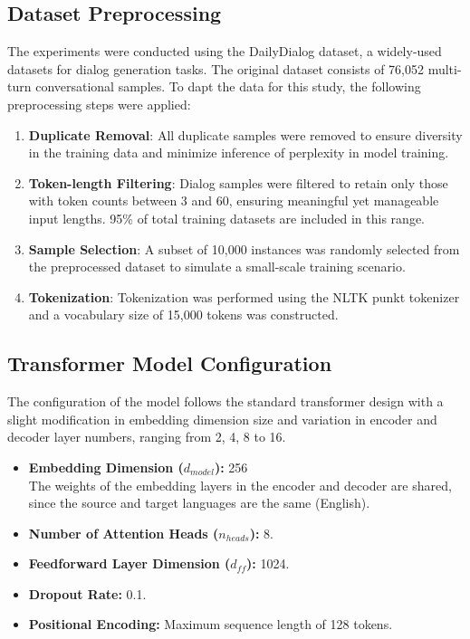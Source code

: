 \documentclass[11pt]{article}
\begin{document}
\subsection{Dataset Preprocessing}
The experiments were conducted using the DailyDialog dataset, a widely-used datasets for dialog generation tasks. The original dataset consists of 76,052 multi-turn conversational samples. To dapt the data for this study, the following preprocessing steps were applied:
    \begin{enumerate}
        \item \textbf{Duplicate Removal}: All duplicate samples were removed to ensure diversity in the training data and minimize inference of perplexity in model training.
        \item \textbf{Token-length Filtering}: Dialog samples were filtered to retain only those with token counts between 3 and 60, ensuring meaningful yet manageable input lengths. 95\% of total training datasets are included in this range.
        \item \textbf{Sample Selection}: A subset of 10,000 instances was randomly selected from the preprocessed dataset to simulate a small-scale training scenario.
        \item \textbf{Tokenization}: Tokenization was performed using the NLTK punkt tokenizer and a vocabulary size of 15,000 tokens was constructed.
    \end{enumerate}

\subsection{Transformer Model Configuration}
The configuration of the model follows the standard transformer design with a slight modification in embedding dimension size and variation in encoder and decoder layer numbers, ranging from 2, 4, 8 to 16. 
\begin{itemize}
    \item \textbf{Embedding Dimension ($d_{model}$):} 256\\ The weights of the embedding layers in the encoder and decoder are shared, since the source and target languages are the same (English).
    \item \textbf{Number of Attention Heads ($n_{heads}$):} 8.
    \item \textbf{Feedforward Layer Dimension ($d_{ff}$):} 1024.
    \item \textbf{Dropout Rate:} 0.1.
    \item \textbf{Positional Encoding:} Maximum sequence length of 128 tokens.
\end{itemize}
\end{document}
